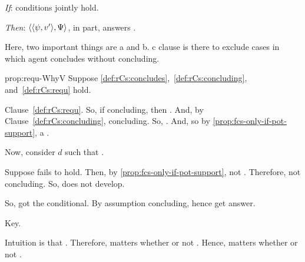 \begin{note}
  \begin{proposition}
    \label{prop:requ-WhyV}

    \begin{itenum}
    \item[\emph{If}:]
       conditions jointly hold.
    \item[\emph{Then}:]
        \(\langle \langle \psi, v' \rangle, \Psi \rangle\), in part, answers \qWhyV{}.
    \end{itenum}
    \vspace{-\baselineskip}
  \end{proposition}

  Here, two important things are a and b.
  c clause is there to exclude cases in which agent concludes without concluding.

  \begin{argument}{prop:requ-WhyV}
    Suppose \ref{def:rCs:concludes},~\ref{def:rCs:concluding}, and~\ref{def:rCs:requ} hold.


    Clause~\ref{def:rCs:requ}.
    So, if concluding, then \fc{}.
    And, by Clause~\ref{def:rCs:concluding}, concluding.
    So, \fc{}.
    And, so by \autoref{prop:fcs-only-if-pot-support}, a \ros{}.

    Now, consider \(d\) such that \requ{}.

    Suppose \ros{} fails to hold.
    Then, by \autoref{prop:fcs-only-if-pot-support}, not \fc{}.
    Therefore, not concluding.
    So, does not develop.

    So, got the conditional.
    By assumption concluding, hence get answer.
  \end{argument}
\end{note}

\begin{note}
  Key.

  Intuition is that \tC{}.
  Therefore, matters whether or not \fc{}.
  Hence, matters whether or not \ros{}.
\end{note}

